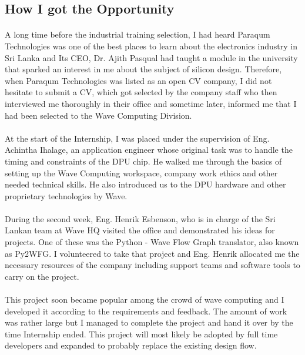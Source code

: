
\subsection{How I got the Opportunity}

\paragraph{}
A long time before the industrial training selection, I had heard Paraqum Technologies was one of the best places to learn about the electronics industry in Sri Lanka and Its CEO, Dr. Ajith Pasqual had taught a module in the university that sparked an interest in me about the subject of silicon design. Therefore, when Paraqum Technologies was listed as an open CV company, I did not hesitate to submit a CV, which got selected by the company staff who then interviewed me thoroughly in their office and sometime later, informed me that I had been selected to the Wave Computing Division.

\paragraph{}
At the start of the Internship, I was placed under the supervision of Eng. Achintha Ihalage, an application engineer whose original task was to handle the timing and constraints of the DPU chip. He walked me through the basics of setting up the Wave Computing workspace, company work ethics and other needed technical skills. He also introduced us to the DPU hardware and other proprietary technologies by Wave.

\paragraph{}
During the second week, Eng. Henrik Esbenson, who is in charge of the Sri Lankan team at Wave HQ visited the office and demonstrated his ideas for projects. One of these was the Python - Wave Flow Graph translator, also known as Py2WFG. I volunteered to take that project and Eng. Henrik allocated me the necessary resources of the company including support teams and software tools to carry on the project.

\paragraph{}
This project soon became popular among the crowd of wave computing and I developed it according to the requirements and feedback. The amount of work was rather large but I managed to complete the project and hand it over by the time Internship ended. This project will most likely be adopted by full time developers and expanded to probably replace the existing design flow.

